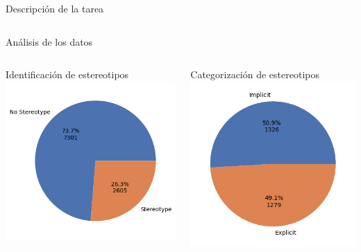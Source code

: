 \begin{frame}{Descripción de la tarea}
\begin{columns}
\begin{table}[]
            \end{table}
    \end{columns}
\end{frame}

\begin{frame}{Análisis de los datos}
    \begin{columns}[T]
        \centering
        Identificación de estereotipos
        \includegraphics[width=\textwidth]{images/detest_hard_labels.png}

        Categorización de estereotipos
        \centering
        \includegraphics[width=\textwidth]{images/detest_soft_labels.png}
    \end{columns}

\end{frame}

